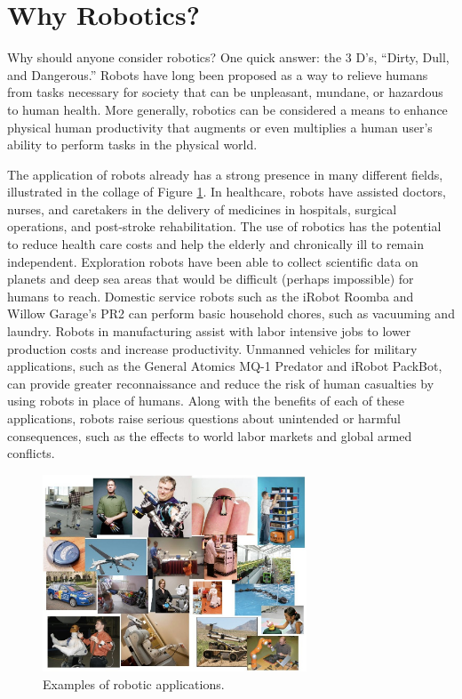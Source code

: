 
\section{Why Robotics?}

Why should anyone consider robotics?  One quick answer: the 3 D's, ``Dirty, Dull, and Dangerous.''  Robots have long been proposed as a way to relieve humans from tasks necessary for society that can be unpleasant, mundane, or hazardous to human health.  More generally, robotics can be considered a means to enhance physical human productivity that augments or even multiplies a human user's ability to perform tasks in the physical world.

The application of robots already has a strong presence in many different fields, illustrated in the collage of Figure \ref{fig:1_robotic_applications}.  In healthcare, robots have assisted doctors, nurses, and caretakers in the delivery of medicines in hospitals, surgical operations, and post-stroke rehabilitation.  The use of robotics has the potential to reduce health care costs and help the elderly and chronically ill to remain independent. Exploration robots have been able to collect scientific data on planets and deep sea areas that would be difficult (perhaps impossible) for humans to reach.  Domestic service robots such as the iRobot Roomba and Willow Garage's PR2 can perform basic household chores, such as vacuuming and laundry.  Robots in manufacturing assist with labor intensive jobs to lower production costs and increase productivity.  Unmanned vehicles for military applications, such as the General Atomics MQ-1 Predator and iRobot PackBot, can provide greater reconnaissance and reduce the risk of human casualties by using robots in place of humans.  Along with the benefits of each of these applications, robots raise serious questions about unintended or harmful consequences, such as the effects to world labor markets and global armed conflicts.

\begin{figure}[!h]
\centering
\includegraphics[width=0.7\textwidth]{figures/1_robotic_applications.jpg}
\caption{Examples of robotic applications.}
\label{fig:1_robotic_applications}
\end{figure}

